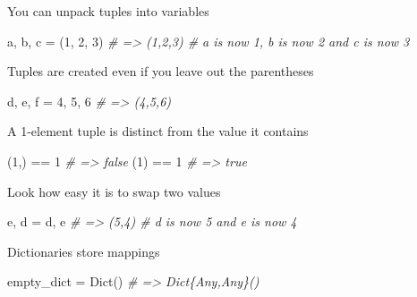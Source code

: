 \documentclass[ignorenonframetext,]{beamer}
\newenvironment{Shaded}{}{}
\newcommand{\DataTypeTok}[1]{\textcolor[rgb]{0.56,0.13,0.00}{{#1}}}
\newcommand{\FloatTok}[1]{\textcolor[rgb]{0.25,0.63,0.44}{{#1}}}
\newcommand{\CommentTok}[1]{\textcolor[rgb]{0.38,0.63,0.69}{\textit{{#1}}}}
\newcommand{\NormalTok}[1]{{#1}}
\begin{document}
\begin{frame}[fragile]{You can unpack tuples into variables}

\begin{Shaded}
\begin{Highlighting}[]
\NormalTok{a, b, c = (}\FloatTok{1}\NormalTok{, }\FloatTok{2}\NormalTok{, }\FloatTok{3}\NormalTok{) }\CommentTok{# => (1,2,3)  # a is now 1, b is now 2 and c is now 3}
\end{Highlighting}
\end{Shaded}

\end{frame}

\begin{frame}[fragile]{Tuples are created even if you leave out the
parentheses}

\begin{Shaded}
\begin{Highlighting}[]
\NormalTok{d, e, f = }\FloatTok{4}\NormalTok{, }\FloatTok{5}\NormalTok{, }\FloatTok{6} \CommentTok{# => (4,5,6)}
\end{Highlighting}
\end{Shaded}

\end{frame}

\begin{frame}[fragile]{A 1-element tuple is distinct from the value it
contains}

\begin{Shaded}
\begin{Highlighting}[]
\NormalTok{(}\FloatTok{1}\NormalTok{,) == }\FloatTok{1} \CommentTok{# => false}
\NormalTok{(}\FloatTok{1}\NormalTok{) == }\FloatTok{1} \CommentTok{# => true}
\end{Highlighting}
\end{Shaded}

\end{frame}

\begin{frame}[fragile]{Look how easy it is to swap two values}

\begin{Shaded}
\begin{Highlighting}[]
\NormalTok{e, d = d, e  }\CommentTok{# => (5,4) # d is now 5 and e is now 4}
\end{Highlighting}
\end{Shaded}

\end{frame}

\begin{frame}[fragile]{Dictionaries store mappings}

\begin{Shaded}
\begin{Highlighting}[]
\NormalTok{empty_dict = }\DataTypeTok{Dict}\NormalTok{() }\CommentTok{# => Dict\{Any,Any\}()}
\end{Highlighting}
\end{Shaded}

\end{frame}
\end{document}
